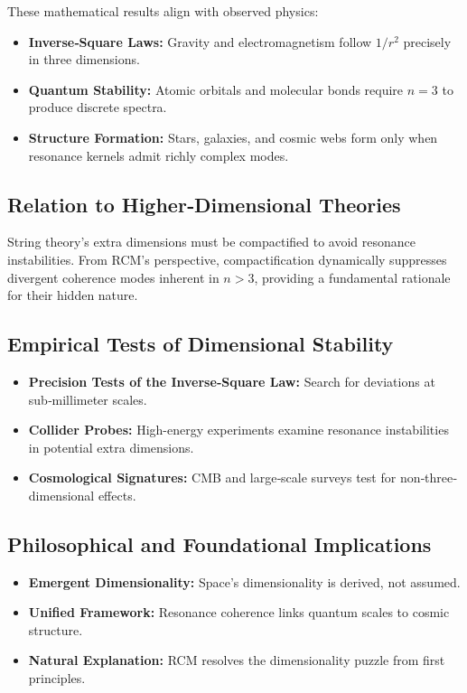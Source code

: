 These mathematical results align with observed physics:
\begin{itemize}
  \item \textbf{Inverse‐Square Laws:} Gravity and electromagnetism follow \(1/r^2\) precisely in three dimensions.
  \item \textbf{Quantum Stability:} Atomic orbitals and molecular bonds require \(n=3\) to produce discrete spectra.
  \item \textbf{Structure Formation:} Stars, galaxies, and cosmic webs form only when resonance kernels admit richly complex modes.
\end{itemize}

\subsection{Relation to Higher‐Dimensional Theories}
\label{sec:higher-d}

String theory’s extra dimensions must be compactified to avoid resonance instabilities. From RCM’s perspective, compactification dynamically suppresses divergent coherence modes inherent in \(n>3\), providing a fundamental rationale for their hidden nature.

\subsection{Empirical Tests of Dimensional Stability}
\label{sec:empirical-tests}

\begin{itemize}
  \item \textbf{Precision Tests of the Inverse‐Square Law:} Search for deviations at sub‐millimeter scales.
  \item \textbf{Collider Probes:} High-energy experiments examine resonance instabilities in potential extra dimensions.
  \item \textbf{Cosmological Signatures:} CMB and large‐scale surveys test for non‐three‐dimensional effects.
\end{itemize}

\subsection{Philosophical and Foundational Implications}
\label{sec:philosophical}

\begin{itemize}
  \item \textbf{Emergent Dimensionality:} Space’s dimensionality is derived, not assumed.
  \item \textbf{Unified Framework:} Resonance coherence links quantum scales to cosmic structure.
  \item \textbf{Natural Explanation:} RCM resolves the dimensionality puzzle from first principles.
\end{itemize}

